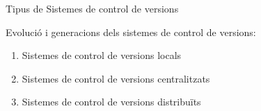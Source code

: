 \documentclass[10pt,xcolor={rgb}]{beamer}
\begin{document}
    \begin{frame}[fragile]{Tipus de Sistemes de control de versions}
      
            
      \begin{block}{Evolució i generacions dels sistemes de control de versions:}
        
        \begin{enumerate}
          \item Sistemes de control de versions locals
          \item Sistemes de control de versions centralitzats
          \item Sistemes de control de versions distribuïts
        \end{enumerate}

      \end{block}

    \end{frame}
      
\end{document}

